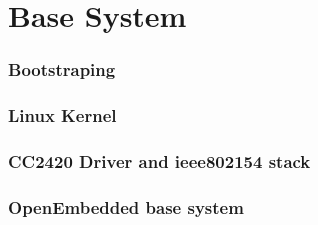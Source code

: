 \chapter{Base System}
\subsection{Bootstraping}
\subsection{Linux Kernel}
\subsection{CC2420 Driver and ieee802154 stack}
\subsection{OpenEmbedded base system}
